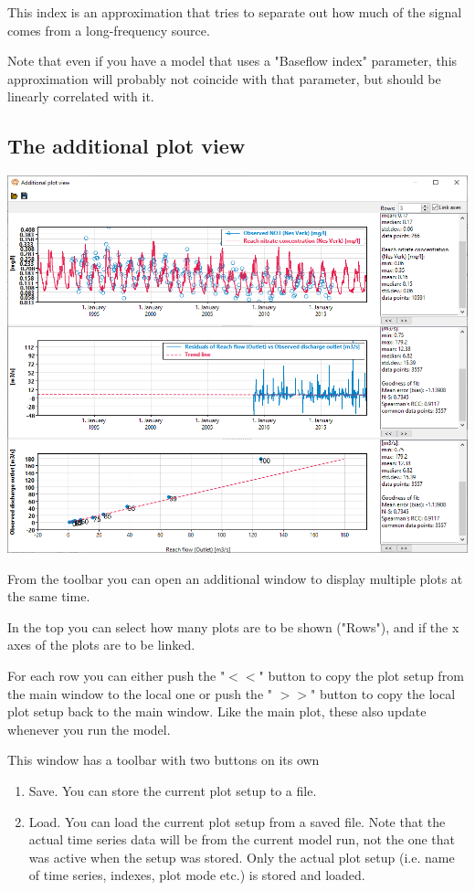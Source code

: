 \documentclass[11pt]{article}
\theoremstyle{definition}
\begin{document}
This index is an approximation that tries to separate out how much of the signal comes from a long-frequency source.

Note that even if you have a model that uses a "Baseflow index" parameter, this approximation will probably not coincide with that parameter, but should be linearly correlated with it.

\subsection{The additional plot view}\label{sec:additionalplotview}

\begin{center}
\includegraphics[width=\linewidth]{img/additionalplotview}
\end{center}

From the toolbar you can open an additional window to display multiple plots at the same time.

In the top you can select how many plots are to be shown ("Rows"), and if the x axes of the plots are to be linked.

For each row you can either push the "$<<$" button to copy the plot setup from the main window to the local one or push the " $>>$" button to copy the local plot setup back to the main window. Like the main plot, these also update whenever you run the model.

This window has a toolbar with two buttons on its own
\begin{enumerate}
\item Save. You can store the current plot setup to a file.
\item Load. You can load the current plot setup from a saved file. Note that the actual time series data will be from the current model run, not the one that was active when the setup was stored. Only the actual plot setup (i.e. name of time series, indexes, plot mode etc.) is stored and loaded.
\end{enumerate}
\end{document}
